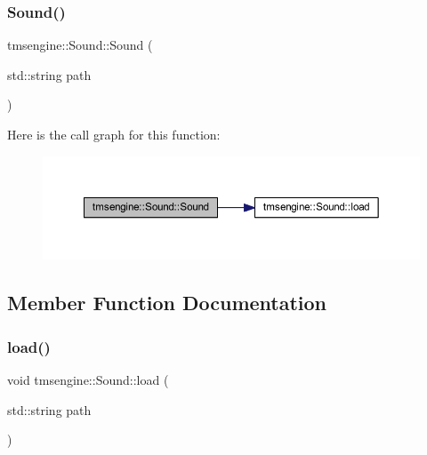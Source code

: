 \mbox{\label{classtmsengine_1_1_sound_a666456cd06cec8089d5be3fce56132f1}} 
\subsubsection{\texorpdfstring{Sound()}{Sound()}\hspace{0.1cm}{\footnotesize\ttfamily [2/2]}}
{\footnotesize\ttfamily tmsengine\+::\+Sound\+::\+Sound (\begin{DoxyParamCaption}\item[{std\+::string}]{path }\end{DoxyParamCaption})}

Here is the call graph for this function\+:\nopagebreak
\begin{figure}[H]
\begin{center}
\leavevmode
\includegraphics[width=350pt]{classtmsengine_1_1_sound_a666456cd06cec8089d5be3fce56132f1_cgraph}
\end{center}
\end{figure}


\subsection{Member Function Documentation}
\mbox{\label{classtmsengine_1_1_sound_aca383fe0b166a15eae25580e1e1e8d41}} 
\subsubsection{\texorpdfstring{load()}{load()}}
{\footnotesize\ttfamily void tmsengine\+::\+Sound\+::load (\begin{DoxyParamCaption}\item[{std\+::string}]{path }\end{DoxyParamCaption})}

